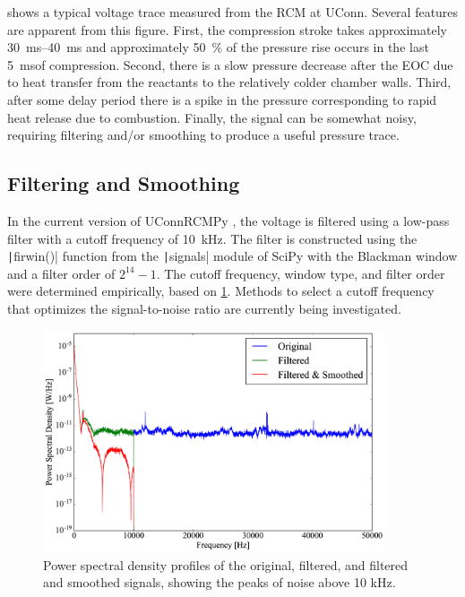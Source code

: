 \documentclass[12pt]{../ussci}
\begin{document}
 shows a typical voltage trace measured from
the RCM at UConn. Several features are apparent from this figure. First,
the compression stroke takes approximately \SIrange{30}{40}{\ms} and
approximately \SI{50}{\percent} of the pressure rise occurs in the last \SI{5}{\ms}of
compression. Second, there is a slow pressure decrease after the EOC due
to heat transfer from the reactants to the relatively colder chamber
walls. Third, after some delay period there is a spike in the pressure
corresponding to rapid heat release due to combustion. Finally, the
signal can be somewhat noisy, requiring filtering and/or smoothing to
produce a useful pressure trace.

\subsection{Filtering and Smoothing}\label{filtering-and-smoothing}

In the current version of UConnRCMPy \autocite{uconnrcmpy}, the voltage
is filtered using a low-pass filter with a cutoff frequency of \SI{10}{\kHz}.
The filter is constructed using the \texttt|firwin()| function from the
\texttt|signals| module of SciPy \autocite{Jones2001} with the Blackman
window \autocite{Blackman1958,Oppenheim1999} and a filter
order of \(2^{14}-1\). The cutoff frequency, window type, and filter
order were determined empirically, based on \cref{fig:frequency}. Methods to select a cutoff frequency that
optimizes the signal-to-noise ratio are currently being investigated.

\begin{figure}[htbp]
\centering
\includegraphics[width=0.9\textwidth]{figures/frequency.png}
\caption{Power spectral density profiles of the original, filtered, and
filtered and smoothed signals, showing the peaks of noise above 10 kHz.}
\label{fig:frequency}
\end{figure}
\end{document}
